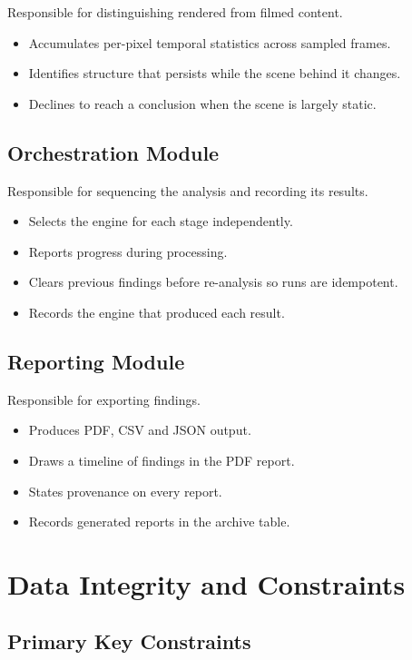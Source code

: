 \documentclass[12pt,a4paper,twoside]{report}
\begin{document}
Responsible for distinguishing rendered from filmed content.

\begin{itemize}
\item Accumulates per-pixel temporal statistics across sampled frames.
\item Identifies structure that persists while the scene behind it changes.
\item Declines to reach a conclusion when the scene is largely static.
\end{itemize}

\subsection{Orchestration Module}

Responsible for sequencing the analysis and recording its results.

\begin{itemize}
\item Selects the engine for each stage independently.
\item Reports progress during processing.
\item Clears previous findings before re-analysis so runs are idempotent.
\item Records the engine that produced each result.
\end{itemize}

\subsection{Reporting Module}

Responsible for exporting findings.

\begin{itemize}
\item Produces PDF, CSV and JSON output.
\item Draws a timeline of findings in the PDF report.
\item States provenance on every report.
\item Records generated reports in the archive table.
\end{itemize}

\section{Data Integrity and Constraints}

\subsection{Primary Key Constraints}
\end{document}
